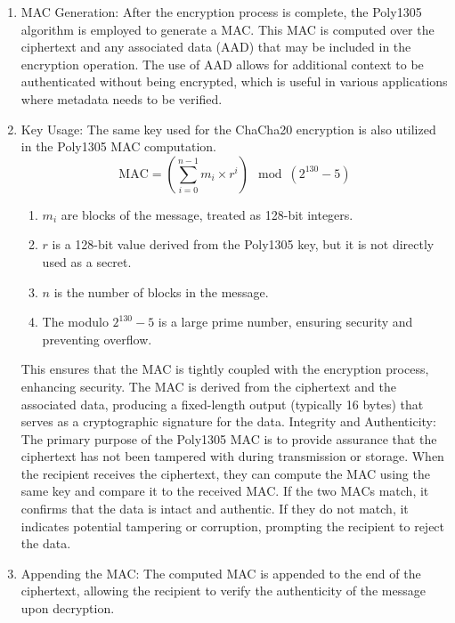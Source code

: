 \documentclass[a4paper,12pt]{report}
\begin{document}
\begin{enumerate}
        \item MAC Generation: After the encryption process is complete, the Poly1305 algorithm is employed to generate a MAC.
        This MAC is computed over the ciphertext and any associated data (AAD) that may be included in the encryption operation.
        The use of AAD allows for additional context to be authenticated without being encrypted, which is useful in various applications where metadata needs to be verified.
        \item Key Usage: The same key used for the ChaCha20 encryption is also utilized in the Poly1305 MAC computation.
    \[
    \text{MAC} = \left( \sum_{i=0}^{n-1} m_i \times r^i \right) \mod (2^{130} - 5)
    \]
    \begin{enumerate}
    \item \( m_i \) are blocks of the message, treated as 128-bit integers.
    \item \( r \) is a 128-bit value derived from the Poly1305 key, but it is not directly used as a secret.
    \item \( n \) is the number of blocks in the message.
    \item The modulo \( 2^{130} - 5 \) is a large prime number, ensuring security and preventing overflow.

    \end{enumerate}
        This ensures that the MAC is tightly coupled with the encryption process, enhancing security.
        The MAC is derived from the ciphertext and the associated data, producing a fixed-length output (typically 16 bytes) that serves as a cryptographic signature for the data.
        Integrity and Authenticity: The primary purpose of the Poly1305 MAC is to provide assurance that the ciphertext has not been tampered with during transmission or storage.
        When the recipient receives the ciphertext, they can compute the MAC using the same key and compare it to the received MAC.
        If the two MACs match, it confirms that the data is intact and authentic.
        If they do not match, it indicates potential tampering or corruption, prompting the recipient to reject the data.
       \item Appending the MAC: The computed MAC is appended to the end of the ciphertext, allowing the recipient to verify the authenticity of the message upon decryption.
\end{enumerate}
\end{document}
